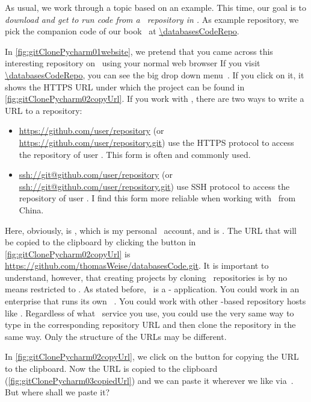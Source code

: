 As usual, we work through a topic based on an example.
This time, our goal is to \emph{download and get to run code from a \github\ repository in \pycharm.}
As example repository, we pick the companion code of our  book~\cite{databases} at \url{\databasesCodeRepo}.

In \cref{fig:gitClonePycharm01website}, we pretend that you came across this interesting repository on \github\ using your normal web browser
If you visit \url{\databasesCodeRepo}, you can see the big drop down menu~.
If you click on it, it shows the HTTPS URL under which the project can be found in \cref{fig:gitClonePycharm02copyUrl}.
If you work with \github, there are two ways to write a URL to a repository:%
%
\begin{itemize}%
%
\item \url{https://github.com/user/repository} (or \url{https://github.com/user/repository.git}) use the HTTPS protocol to access the repository  of user . %
This form is often and commonly used.%
%
\item \url{ssh://git@github.com/user/repository} (or \url{ssh://git@github.com/user/repository.git}) use SSH protocol to access the repository  of user . %
I find this form more reliable when working with \github\ from China.%
%
\end{itemize}%
%
Here, obviously,  is , which is my personal \github\ account, and  is .
The URL that will be copied to the clipboard by clicking the button in \cref{fig:gitClonePycharm02copyUrl} is \url{https://github.com/thomasWeise/databasesCode.git}.
It is important to understand, however, that creating projects by cloning \git\ repositories is by no means restricted to \github.
As stated before, \git\ is a - application.
You could work in an enterprise that runs its own \git\ .
You could work with other \git-based repository hosts like .
Regardless of what \git\ service you use, you could use the very same way to type in the corresponding repository URL and then clone the repository in the same way.
Only the structure of the URLs may be different.

In \cref{fig:gitClonePycharm02copyUrl}, we click on the button for copying the URL to the clipboard.
Now the URL is copied to the clipboard (\cref{fig:gitClonePycharm03copiedUrl}) and we can paste it wherever we like via~.
But where shall we paste it?

